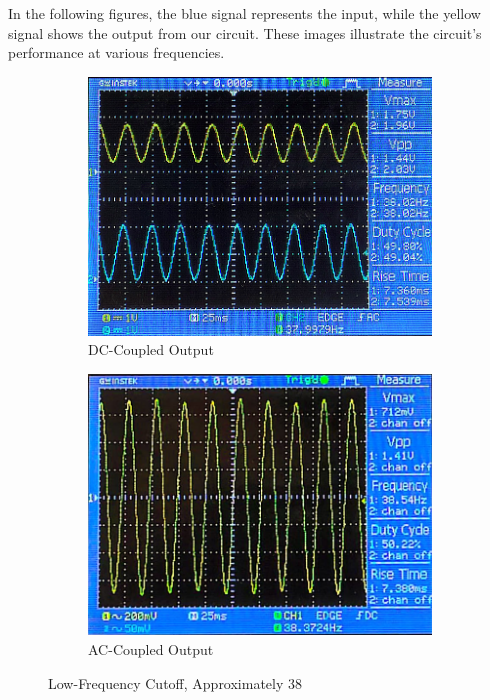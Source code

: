 \documentclass[hidelinks,12pt]{article}
\begin{document}
	In the following figures, the blue signal represents the input, while the yellow signal shows the output from our circuit. These images illustrate the circuit's performance at various frequencies.
	\\
	\begin{figure}[!h]
		\centering
		\begin{subfigure}[t]{0.45\textwidth}
			\centering
			\includegraphics[height=0.75\linewidth]{figures/results/38hz_double}
			\caption{DC-Coupled Output}
		\end{subfigure}
		\hfill
		\begin{subfigure}[t]{0.45\textwidth}
			\centering
			\includegraphics[height=0.75\linewidth]{figures/results/38hz_output_ac}
			\caption{AC-Coupled Output}
		\end{subfigure}
		\caption{Low-Frequency Cutoff, Approximately 38\,}
	\end{figure}
	
\end{document}
